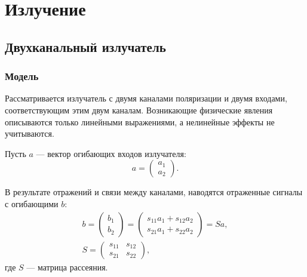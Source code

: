 \chapter{Излучение}


\section{Двухканальный излучатель}

\subsection{Модель}

Рассматривается излучатель с двумя каналами поляризации и двумя входами, соответствующим этим двум каналам. Возникающие физические явления описываются только
линейными выражениями, а нелинейные эффекты не учитываются.

Пусть $a$ --- вектор огибающих входов излучателя:
\[
    a
    = \begin{pmatrix}
          a_1 \\
          a_2
    \end{pmatrix} .
\]

В результате отражений и связи между каналами, наводятся отраженные сигналы с огибающими $b$:
\begin{gather*}
    b
    = \begin{pmatrix}
          b_1 \\
          b_2
    \end{pmatrix}
    = \begin{pmatrix}
          s_{11} a_1 + s_{12} a_2 \\
          s_{21} a_1 + s_{22} a_2
    \end{pmatrix}
    = S a, \\
    S
    = \begin{pmatrix}
          s_{11} & s_{12} \\
          s_{21} & s_{22}
    \end{pmatrix},
\end{gather*}
где $S$ --- матрица рассеяния.

